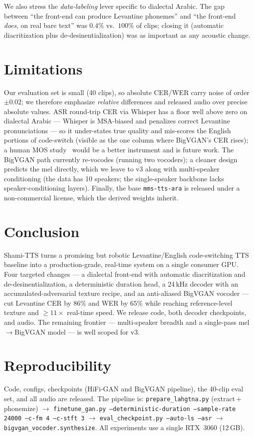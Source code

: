 \documentclass[10pt,twocolumn]{article}
\begin{document}
We also stress the \emph{data-labeling} lever specific to dialectal Arabic. The gap between
``the front-end can produce Levantine phonemes'' and ``the front-end \emph{does}, on real
bare text'' was \(0.4\%\) vs.\ \(100\%\) of clips; closing it (automatic diacritization plus
de-desinentialization) was as important as any acoustic change.

\section{Limitations}
Our evaluation set is small (40 clips), so absolute CER/WER carry noise of order \(\pm0.02\);
we therefore emphasize \emph{relative} differences and released audio over precise absolute
values. ASR round-trip CER via Whisper has a floor well above zero on dialectal
Arabic --- Whisper is MSA-biased and penalizes correct Levantine pronunciations --- so it
under-states true quality and mis-scores the English portions of code-switch (visible as the
one column where BigVGAN's CER rises); a human MOS study~\cite{mos} would be a better instrument and is future
work. The BigVGAN path currently re-vocodes (running two vocoders); a cleaner design predicts
the mel directly, which we leave to v3 along with multi-speaker conditioning (the data has 10
speakers; the single-speaker backbone lacks speaker-conditioning layers). Finally, the base
\texttt{mms-tts-ara} is released under a non-commercial license, which the derived weights
inherit.

\section{Conclusion}
Shami-TTS turns a promising but robotic Levantine/English code-switching TTS baseline into a
production-grade, real-time system on a single consumer GPU. Four targeted changes ---
a dialectal front-end with automatic diacritization and de-desinentialization, a deterministic
duration head, a 24\,kHz decoder with an accumulated-adversarial texture recipe, and an
anti-aliased BigVGAN vocoder --- cut Levantine CER by \(86\%\) and WER by \(65\%\) while
reaching reference-level texture and \(\geq\!11\times\) real-time speed. We release code,
both decoder checkpoints, and audio. The remaining frontier --- multi-speaker breadth and a
single-pass mel\(\rightarrow\)BigVGAN model --- is well scoped for v3.

\section*{Reproducibility}
Code, configs, checkpoints (HiFi-GAN and BigVGAN pipeline), the 40-clip eval set, and all
audio are released. The pipeline is:
\texttt{prepare\_lahgtna.py} (extract\,+\,phonemize) \(\rightarrow\)
\texttt{finetune\_gan.py --deterministic-duration --sample-rate 24000 --c-fm 4 --c-stft 3}
\(\rightarrow\) \texttt{eval\_checkpoint.py --auto-ls --asr} \(\rightarrow\)
\texttt{bigvgan\_vocoder.synthesize}. All experiments use a single RTX~3060 (12\,GB).
\end{document}
